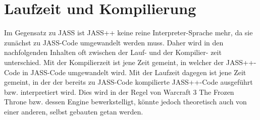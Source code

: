 \chapter{Laufzeit und Kompilierung}
Im Gegensatz zu JASS ist JASS++ keine reine Interpreter-Sprache mehr, da sie zunächst zu JASS-Code
umgewandelt werden muss. Daher wird in den nachfolgenden Inhalten oft zwischen der Lauf- und der Kompilier-
zeit unterschied. Mit der Kompilierzeit ist jene Zeit gemeint, in welcher der JASS++-Code in JASS-Code
umgewandelt wird. Mit der Laufzeit dagegen ist jene Zeit gemeint, in der der bereits zu JASS-Code kompilierte
JASS++-Code ausgeführt bzw. interpretiert wird. Dies wird in der Regel von Warcraft 3 The Frozen Throne bzw. dessen Engine
bewerkstelligt, könnte jedoch theoretisch auch von einer anderen, selbst gebauten getan werden.